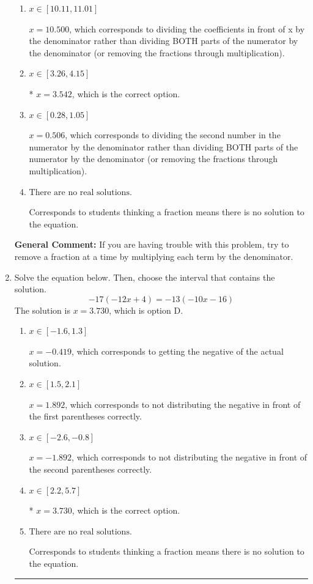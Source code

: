 \documentclass{extbook}[14pt]
\newcommand{\litem}[1]{\item #1

\rule{\textwidth}{0.4pt}}
\begin{document}
\begin{enumerate}
{\begin{enumerate}[label=\Alph*.]
 $x = 1.792$, which corresponds to not distributing the negative in front of the second fraction.
\item \( x \in [10.11, 11.01] \)

 $x = 10.500$, which corresponds to dividing the coefficients in front of x by the denominator rather than dividing BOTH parts of the numerator by the denominator (or removing the fractions through multiplication).
\item \( x \in [3.26, 4.15] \)

* $x = 3.542$, which is the correct option.
\item \( x \in [0.28, 1.05] \)

 $x = 0.506$, which corresponds to dividing the second number in the numerator by the denominator rather than dividing BOTH parts of the numerator by the denominator (or removing the fractions through multiplication).
\item \( \text{There are no real solutions.} \)

Corresponds to students thinking a fraction means there is no solution to the equation.
\end{enumerate}

\textbf{General Comment:} If you are having trouble with this problem, try to remove a fraction at a time by multiplying each term by the denominator.
}
\litem{
Solve the equation below. Then, choose the interval that contains the solution.
\[ -17(-12x + 4) = -13(-10x -16) \]The solution is \( x = 3.730 \), which is option D.\begin{enumerate}[label=\Alph*.]
\item \( x \in [-1.6, 1.3] \)

$x = -0.419$, which corresponds to getting the negative of the actual solution.
\item \( x \in [1.5, 2.1] \)

$x = 1.892$, which corresponds to not distributing the negative in front of the first parentheses correctly.
\item \( x \in [-2.6, -0.8] \)

$x = -1.892$, which corresponds to not distributing the negative in front of the second parentheses correctly.
\item \( x \in [2.2, 5.7] \)

* $x = 3.730$, which is the correct option.
\item \( \text{There are no real solutions.} \)

Corresponds to students thinking a fraction means there is no solution to the equation.
\end{enumerate}

}
\end{enumerate}
\end{document}
